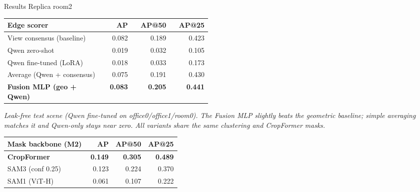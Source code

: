\documentclass[a0,landscape]{a0poster}
\begin{document}
\begin{minipage}[t]{0.295\linewidth}
\vspace{0pt}

\begin{posterbox}[before skip=0mm]{Results \textperiodcentered\; Replica room2}
  \begin{center}
  \normalsize
  \renewcommand{\arraystretch}{1.15}
  \begin{tabular}{@{}>{\raggedright\arraybackslash}p{0.48\linewidth}rrr@{}}
    \toprule
    \textbf{Edge scorer} & \textbf{AP} & \textbf{AP@50} & \textbf{AP@25}\\
    \midrule
    View consensus (baseline) & 0.082 & 0.189 & 0.423\\
    Qwen zero-shot             & 0.019 & 0.032 & 0.105\\
    Qwen fine-tuned (LoRA)    & 0.018 & 0.033 & 0.173\\
    Average (Qwen + consensus)& 0.075 & 0.191 & 0.430\\
    \rowcolor{accentpale}
    \textbf{Fusion MLP (geo + Qwen)} & \textbf{0.083} & \textbf{0.205} & \textbf{0.441}\\
    \bottomrule
  \end{tabular}
  \end{center}
  \vspace{3mm}
  {\normalsize\itshape Leak-free test scene (Qwen fine-tuned on
  office0/office1/room0). The Fusion MLP slightly beats the geometric baseline;
  simple averaging matches it and Qwen-only stays near zero. All variants share
  the same clustering and CropFormer masks.}

  \vspace{5mm}
  \begin{center}
  \normalsize
  \renewcommand{\arraystretch}{1.15}
  \begin{tabular}{@{}>{\raggedright\arraybackslash}p{0.48\linewidth}rrr@{}}
    \toprule
    \textbf{Mask backbone (M2)} & \textbf{AP} & \textbf{AP@50} & \textbf{AP@25}\\
    \midrule
    \rowcolor{accentpale}
    \textbf{CropFormer} & \textbf{0.149} & \textbf{0.305} & \textbf{0.489}\\
    SAM3 (conf 0.25)    & 0.123 & 0.224 & 0.370\\
    SAM1 (ViT-H)        & 0.061 & 0.107 & 0.222\\
    \bottomrule
  \end{tabular}
  \end{center}
\end{posterbox}


\end{minipage}
\end{document}
